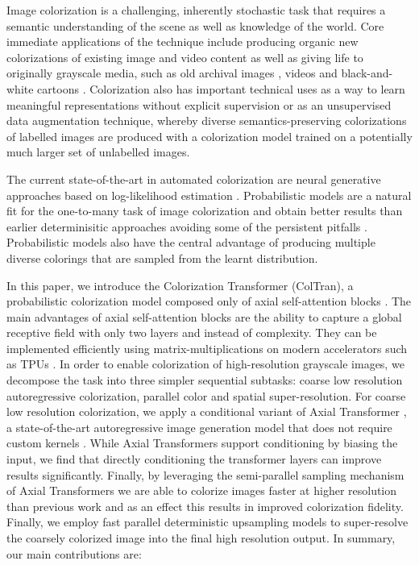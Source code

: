 \documentclass{article} \usepackage{iclr2021_conference,times}
\begin{document}
Image colorization is a challenging, inherently stochastic task that requires a semantic understanding of the scene as well as knowledge of the world.
Core immediate applications of the technique include producing organic new colorizations of existing image and video content as well as giving life to originally grayscale media, such as old archival images \citep{tsaftaris2014novel}, videos \citep{geshwind1986method} and black-and-white cartoons \citep{sykora2004unsupervised, qu2006manga, cinarel2017into}.
Colorization also has important technical uses as a way to learn meaningful representations without explicit supervision \citep{zhang2016colorful, larsson2016learning, vondrick2018tracking} or as an unsupervised data augmentation technique, whereby diverse semantics-preserving colorizations of labelled images are produced with a colorization model trained on a potentially much larger set of unlabelled images. 



The current state-of-the-art in automated colorization are neural generative approaches based on log-likelihood estimation \citep{guadarrama2017pixcolor,royer2017probabilistic,ardizzone2019guided}. Probabilistic models are a natural fit for the one-to-many task of image colorization and obtain better results than earlier determinisitic approaches avoiding some of the persistent pitfalls \citep{zhang2016colorful}. Probabilistic models also have the central advantage of producing multiple diverse colorings that are sampled from the learnt distribution. 

In this paper, we introduce the Colorization Transformer (ColTran), a probabilistic colorization model composed only of axial self-attention blocks \citep{ho2019axial, wang2020axial}. The main advantages of axial self-attention blocks are the ability to capture a global receptive field with only two layers and  instead of  complexity. They can be implemented efficiently using matrix-multiplications on modern accelerators such as TPUs \citep{jouppi2017indatacenter}.
In order to enable colorization of high-resolution grayscale images, we decompose the task into three simpler sequential subtasks: coarse low resolution autoregressive colorization, parallel color and spatial super-resolution. For coarse low resolution colorization, we apply a conditional variant of Axial Transformer \citep{ho2019axial}, a state-of-the-art autoregressive image generation model that does not require custom kernels \citep{child2019generating}. While Axial Transformers support conditioning by biasing the input, we find that directly conditioning the transformer layers can improve results significantly. Finally, by leveraging the semi-parallel sampling mechanism of Axial Transformers we are able to colorize images faster at higher resolution than previous work \citep{guadarrama2017pixcolor} and as an effect this results in improved colorization fidelity. Finally, we employ fast parallel deterministic upsampling models to super-resolve the coarsely colorized image into the final high resolution output. In summary, our main contributions are:
\end{document}
